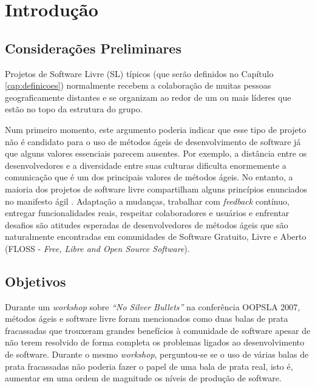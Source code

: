 \chapter{Introdução}
\label{cap:introducao}

\section{Considerações Preliminares}
\label{sec:consideracoes_preliminares}

Projetos de Software Livre (SL) típicos (que serão definidos no
Capítulo \ref{cap:definicoes}) normalmente recebem a colaboração de
muitas pessoas geograficamente distantes \cite{Dempsey1999} e se
organizam ao redor de um ou mais líderes que estão no topo da
estrutura do grupo.

Num primeiro momento, este argumento poderia indicar que esse tipo de
projeto não é candidato para o uso de métodos ágeis de desenvolvimento
de software já que alguns valores essenciais parecem ausentes. Por
exemplo, a distância entre os desenvolvedores e a diversidade entre
suas culturas dificulta enormemente a comunicação que é um dos
principais valores de métodos ágeis. No entanto, a maioria dos
projetos de software livre compartilham alguns princípios enunciados
no manifesto ágil \cite{AgileManifesto}. Adaptação a mudanças,
trabalhar com \emph{feedback} contínuo, entregar funcionalidades
reais, respeitar colaboradores e usuários e enfrentar desafios são
atitudes esperadas de desenvolvedores de métodos ágeis que são
naturalmente encontradas em comunidades de Software Gratuito, Livre e
Aberto (FLOSS - \emph{Free, Libre and Open Source Software}).


\section{Objetivos}
\label{sec:objetivo}

Durante um \emph{workshop} \cite{OOPSLA07} sobre \emph{``No Silver
  Bullets''} \cite{Brooks1987} na conferência OOPSLA 2007, métodos
ágeis e software livre foram mencionados como duas balas de prata
fracassadas que trouxeram grandes benefícios à comunidade de software
apesar de não terem resolvido de forma completa os problemas ligados
ao desenvolvimento de software. Durante o mesmo \emph{workshop},
perguntou-se se o uso de várias balas de prata fracassadas não poderia
fazer o papel de uma bala de prata real, isto é, aumentar em uma ordem
de magnitude os níveis de produção de software.

